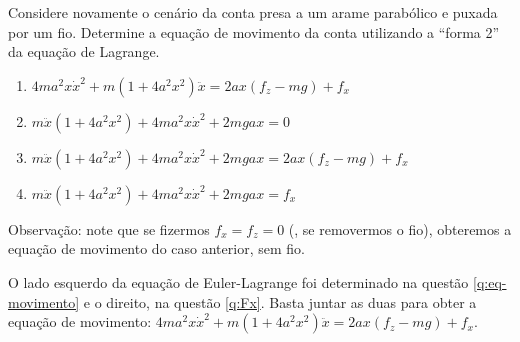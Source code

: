 \begin{question}
    Considere novamente o cenário da conta presa a um arame parabólico e puxada por um fio.
    Determine a equação de movimento da conta utilizando a ``forma 2'' da equação de Lagrange.
    \begin{enumerate}
      \item $4ma^2x\dot x^2 + m(1 + 4a^2 x^2)\ddot x = 2ax(f_z - mg) + f_x$ \rightanswer
      \item $m\ddot x(1 + 4a^2x^2) + 4ma^2 x \dot x^2 + 2mgax = 0$
      \item $m\ddot x(1 + 4a^2x^2) + 4ma^2 x \dot x^2 + 2mgax = 2ax(f_z - mg) + f_x$
      \item $m\ddot x(1 + 4a^2x^2) + 4ma^2 x \dot x^2 + 2mgax = f_x$
    \end{enumerate}

    \bigskip
    \begin{compactdesc}
      \item[Observação:] note que se fizermos $f_x = f_z = 0$ (\ie, se removermos o fio), obteremos a equação de movimento do caso anterior, sem fio.
    \end{compactdesc}

    \begin{solution}
      O lado esquerdo da equação de Euler-Lagrange foi determinado na questão \ref{q:eq-movimento} e o direito, na questão \ref{q:Fx}.
      Basta juntar as duas para obter a equação de movimento: $4ma^2x\dot x^2 + m(1 + 4a^2 x^2)\ddot x = 2ax(f_z - mg) + f_x$.
    \end{solution}
\end{question}